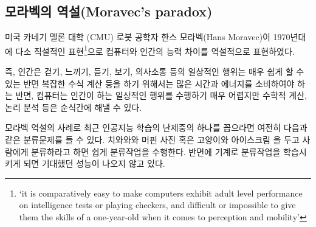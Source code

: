 \documentclass[smallextended]{svjour3}       %
\begin{document}
\begin{table}[H]
\centering
{}
\end{table}

\hypertarget{uxbaa8uxb77cuxbca1uxc758-uxc5eduxc124moravecs-paradox}{%
\subsection{모라벡의 역설(Moravec's
paradox)}\label{uxbaa8uxb77cuxbca1uxc758-uxc5eduxc124moravecs-paradox}}

미국 카네기 멜론 대학 (CMU) 로봇 공학자 한스 모라벡(Hans Moravec)이
1970년대에 다소 직설적인 표현\footnote{`it is comparatively easy to make
  computers exhibit adult level performance on intelligence tests or
  playing checkers, and difficult or impossible to give them the skills
  of a one-year-old when it comes to perception and mobility'}으로
컴퓨터와 인간의 능력 차이를 역설적으로 표현하였다.

즉, 인간은 걷기, 느끼기, 듣기, 보기, 의사소통 등의 일상적인 행위는 매우
쉽게 할 수 있는 반면 복잡한 수식 계산 등을 하기 위해서는 많은 시간과
에너지를 소비하여야 하는 반면, 컴퓨터는 인간이 하는 일상적인 행위를
수행하기 매우 어렵지만 수학적 계산, 논리 분석 등은 순식간에 해낼 수
있다.

모라벡 역설의 사례로 최근 인공지능 학습의 난제중의 하나를 꼽으라면
여전히 다음과 같은 분류문제를 들 수 있다. 치와와와 머핀 사진 혹은
고양이와 아이스크림 을 두고 사람에게 분류하라고 하면 쉽게 분류작업을
수행한다. 반면에 기계로 분류작업을 학습시키게 되면 기대했던 성능이
나오지 않고 있다.
\end{document}
